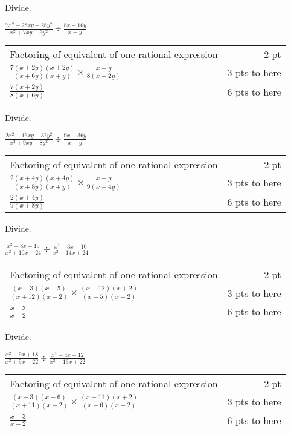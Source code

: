 {
	Divide.\par
	$\displaystyle\frac{7x^2+28xy+28y^2}{x^2+7xy+6y^2} \div \frac{8x+16y}{x+y}$
}
{
	\begin{tabular}{l r}
	Factoring of equivalent of one rational expression & 2 pt \\
	$\frac{7(x+2y)(x+2y)}{(x+6y)(x+y)} \times\frac{x+y}{8(x+2y)}$ & 3 pts to here\\
	$\frac{7(x+2y)}{8(x+6y)}$ & 6 pts to here
	\end{tabular}
}

{
	Divide.\par
	$\displaystyle\frac{2x^2+16xy+32y^2}{x^2+9xy+8y^2} \div \frac{9x+36y}{x+y}$
}
{
	\begin{tabular}{l r}
	Factoring of equivalent of one rational expression & 2 pt \\
	$\frac{2(x+4y)(x+4y)}{(x+8y)(x+y)} \times\frac{x+y}{9(x+4y)}$ & 3 pts to here\\
	$\frac{2(x+4y)}{9(x+8y)}$ & 6 pts to here
	\end{tabular}
}

{
	Divide.\par
	$\displaystyle\frac{x^2-8x+15}{x^2+10x-24} \div \frac{x^2-3x-10}{x^2+14x+24}$
}
{
	\begin{tabular}{l r}
	Factoring of equivalent of one rational expression & 2 pt \\
	$\frac{(x-3)(x-5)}{(x+12)(x-2)} \times \frac{(x+12)(x+2)}{(x-5)(x+2)}$ & 3 pts to here\\
	$\frac{x-3}{x-2}$ & 6 pts to here
	\end{tabular}
}

{
	Divide.\par
	$\displaystyle\frac{x^2-9x+18}{x^2+9x-22} \div \frac{x^2-4x-12}{x^2+13x+22}$
}
{
	\begin{tabular}{l r}
	Factoring of equivalent of one rational expression & 2 pt \\
	$\frac{(x-3)(x-6)}{(x+11)(x-2)} \times \frac{(x+11)(x+2)}{(x-6)(x+2)}$ & 3 pts to here\\
	$\frac{x-3}{x-2}$ & 6 pts to here
	\end{tabular}
}
